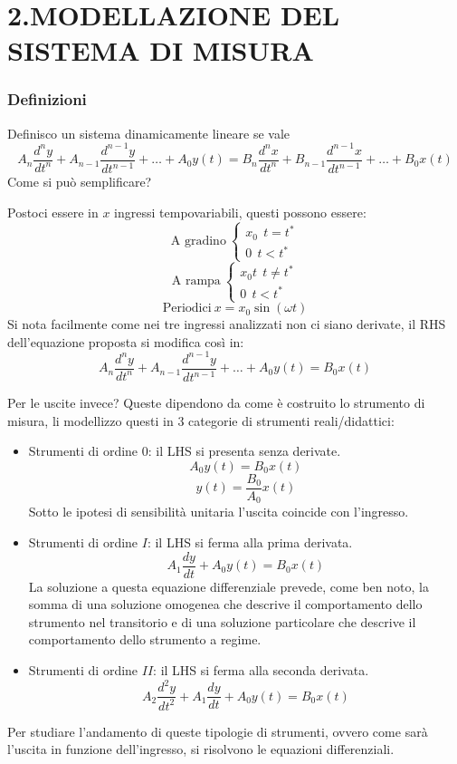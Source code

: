 \documentclass[a4paper, 15pt]{article}
\begin{document}
	\tableofcontents 
	\newpage
				
\part{2.MODELLAZIONE DEL SISTEMA DI MISURA}
				
				
				
\section{Definizioni}	
\begin{adjustwidth}{2in}{}
	  
	Definisco un sistema dinamicamente lineare se vale 
	\[ A_n \dfrac{d^ny}{dt^n} + A_{n-1} \dfrac{d^{n-1}y}{dt^{n-1}} + \dots + A_0 y(t) = B_n \dfrac{d^nx}{dt^n} + B_{n-1} \dfrac{d^{n-1}x}{dt^{n-1}} + \dots + B_0 x(t)  \]
	Come si può semplificare? \newline 
	
	Postoci essere in $x$ ingressi tempovariabili, questi possono essere:
	\[ \text{A gradino} ~ \begin{cases}
		x_0 ~~ t = t^* \\
		0 ~~ t<t^*
	\end{cases}\] 
	\[ \text{A rampa} ~ \begin{cases}
		x_0t ~~ t \neq t^* \\
		0 ~~ t<t^*
	\end{cases}\]
	\[ \text{Periodici} ~ x = x_0\sin(\omega t)\]
	Si nota facilmente come nei tre ingressi analizzati non ci siano derivate, il RHS dell'equazione proposta si modifica così in: 
	\[ A_n \dfrac{d^ny}{dt^n} + A_{n-1} \dfrac{d^{n-1}y}{dt^{n-1}} + \dots + A_0 y(t) = B_0 x(t)  \]
	
	Per le uscite invece? Queste dipendono da come è costruito lo strumento di misura, li modellizzo questi in 3 categorie di strumenti reali/didattici:
	\begin{itemize}
		\item Strumenti di ordine $ 0 $: il LHS si presenta senza derivate. 
		\[  A_0 y(t) = B_0 x(t) \]
		\[   y(t) = \dfrac{B_0}{A_0} x(t) \]
		Sotto le ipotesi di sensibilità unitaria l'uscita coincide con l'ingresso. 
		\item Strumenti di ordine $ I $: il LHS si ferma alla prima derivata.
		\[ A_1 \dfrac{dy}{dt} + A_0 y(t) = B_0 x(t)  \]
		La soluzione a questa equazione differenziale prevede, come ben noto, la somma di una soluzione omogenea che descrive il comportamento dello strumento nel transitorio e di una soluzione particolare che descrive il comportamento dello strumento a regime. 
		\item Strumenti di ordine $ II $: il LHS si ferma alla seconda derivata.
		\[ A_2 \dfrac{d^2y}{dt^2} + A_1 \dfrac{dy}{dt} + A_0 y(t) = B_0 x(t)  \]
	\end{itemize}
	
	Per studiare l'andamento di queste tipologie di strumenti, ovvero come sarà l'uscita in funzione dell'ingresso, si risolvono le equazioni differenziali. \newline 
\end{adjustwidth}
\end{document}
